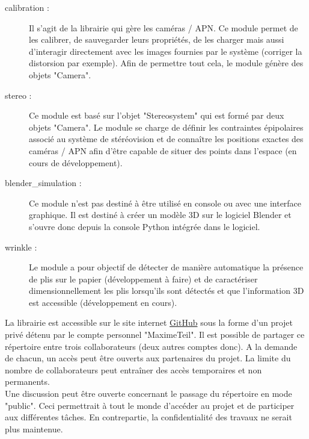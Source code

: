 \documentclass[a4paper, 11pt]{article}
\begin{document}
		\begin{description}
			\item[calibration :] Il s'agit de la librairie qui gère les caméras / APN. Ce module permet de les calibrer, de sauvegarder leurs propriétés, de les charger mais aussi d'interagir directement avec les images fournies par le système (corriger la distorsion par exemple). Afin de permettre tout cela, le module génère des objets "Camera".
			\item[stereo :] Ce module est basé sur l'objet "Stereosystem" qui est formé par deux objets "Camera". Le module se charge de définir les contraintes épipolaires associé au système de stéréovision et de connaître les positions exactes des caméras / APN afin d'être capable de situer des points dans l'espace (en cours de développement).
			\item[blender\_simulation :] Ce module n'est pas destiné à être utilisé en console ou avec une interface graphique. Il est destiné à créer un modèle 3D sur le logiciel Blender et s'ouvre donc depuis la console Python intégrée dans le logiciel.
			\item[wrinkle :] Le module a pour objectif de détecter de manière automatique la présence de plis sur le papier (développement à faire) et de caractériser dimensionnellement les plis lorsqu'ils sont détectés et que l'information 3D est accessible (développement en cours).
		\end{description}
		La librairie est accessible sur le site internet \href{https://github.com/}{GitHub} sous la forme d'un projet privé détenu par le compte personnel "MaximeTeil". Il est possible de partager ce répertoire entre trois collaborateurs (deux autres comptes donc). A la demande de chacun, un accès peut être ouverts aux partenaires du projet. La limite du nombre de collaborateurs peut entraîner des accès temporaires et non permanents.
		\\Une discussion peut être ouverte concernant le passage du répertoire en mode "public". Ceci permettrait à tout le monde d'accéder au projet et de participer aux différentes tâches. En contrepartie, la confidentialité des travaux ne serait plus maintenue.
	
\end{document}

